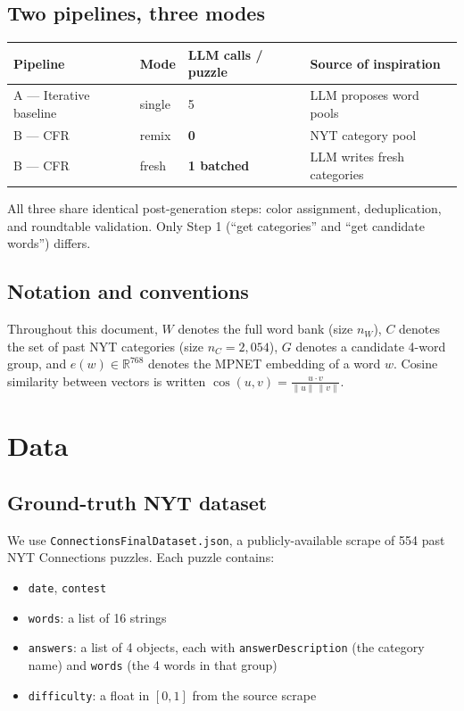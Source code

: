 \documentclass[11pt, letterpaper]{article}
\begin{document}
\subsection{Two pipelines, three modes}

\begin{center}
\begin{tabular}{l l l l}
\toprule
\textbf{Pipeline} & \textbf{Mode} & \textbf{LLM calls / puzzle} & \textbf{Source of inspiration} \\
\midrule
A --- Iterative baseline     & single    & 5                 & LLM proposes word pools \\
B --- CFR                    & remix     & \textbf{0}        & NYT category pool \\
B --- CFR                    & fresh     & \textbf{1 batched}& LLM writes fresh categories \\
\bottomrule
\end{tabular}
\end{center}

All three share identical post-generation steps: color assignment, deduplication,
and roundtable validation. Only Step 1 (``get categories'' and ``get candidate
words'') differs.

\subsection{Notation and conventions}
Throughout this document, $W$ denotes the full word bank (size $n_W$), $C$ denotes
the set of past NYT categories (size $n_C = 2{,}054$), $G$ denotes a candidate
4-word group, and $e(w) \in \mathbb{R}^{768}$ denotes the MPNET embedding of a
word $w$. Cosine similarity between vectors is written $\cos(u, v) = \tfrac{u \cdot v}{\|u\|\,\|v\|}$.

\section{Data}

\subsection{Ground-truth NYT dataset}
We use \texttt{ConnectionsFinalDataset.json}, a publicly-available scrape of 554
past NYT Connections puzzles. Each puzzle contains:
\begin{itemize}[leftmargin=*, itemsep=0.1em]
\item \texttt{date}, \texttt{contest}
\item \texttt{words}: a list of 16 strings
\item \texttt{answers}: a list of 4 objects, each with
\texttt{answerDescription} (the category name) and \texttt{words} (the 4 words
in that group)
\item \texttt{difficulty}: a float in $[0, 1]$ from the source scrape
\end{itemize}
\end{document}
